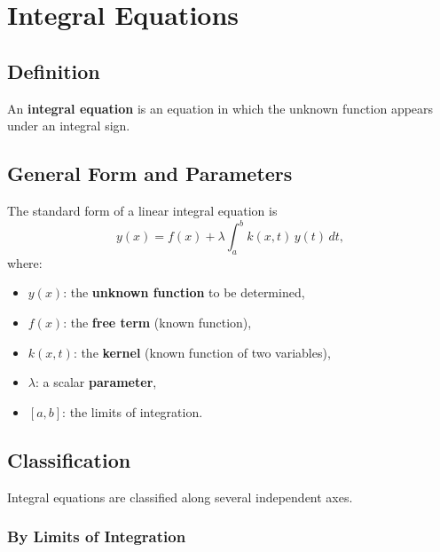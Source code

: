 \chapter{Integral Equations}

\section{Definition}

\begin{definition}
An \textbf{integral equation} is an equation in which the unknown function appears under an integral sign.
\end{definition}

\section{General Form and Parameters}

The standard form of a linear integral equation is
\[
  y(x) = f(x) + \lambda \int_a^b k(x,t)\,y(t)\,dt,
\]
where:
\begin{itemize}
  \item $y(x)$: the \textbf{unknown function} to be determined,
  \item $f(x)$: the \textbf{free term} (known function),
  \item $k(x,t)$: the \textbf{kernel} (known function of two variables),
  \item $\lambda$: a scalar \textbf{parameter},
  \item $[a,b]$: the limits of integration.
\end{itemize}

\section{Classification}

Integral equations are classified along several independent axes.

\subsection{By Limits of Integration}

